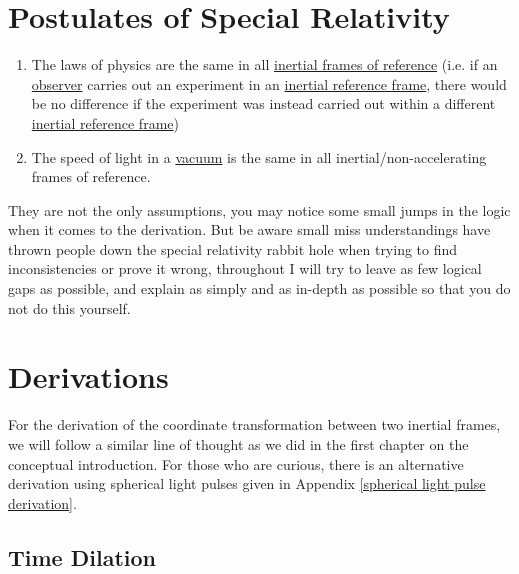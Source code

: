 \section{Postulates of Special Relativity}

\begin{tcolorbox}[breakable]
	\begin{enumerate}
		\item The laws of physics are the same in all \hyperlink{def-Inertial-reference-frame}{inertial frames of reference} (i.e. if an \hyperlink{def-observer}{observer} carries out an experiment in an \hyperlink{def-Inertial-reference-frame}{inertial reference frame}, there would be no difference if the experiment was instead carried out within a different \hyperlink{def-Inertial-reference-frame}{inertial reference frame})
		\item The speed of light in a \hyperlink{def-vacuum}{vacuum} is the same in all inertial/non-accelerating frames of reference.
	\end{enumerate}
\end{tcolorbox}

They are not the only assumptions, you may notice some small jumps in the logic when it comes to the derivation. But be aware small miss understandings have thrown people down the special relativity rabbit hole when trying to find inconsistencies or prove it wrong, throughout I will try to leave as few logical gaps as possible, and explain as simply and as in-depth as possible so that you do not do this yourself.

\section{Derivations}%
For the derivation of the coordinate transformation between two inertial frames, we will follow a similar line of thought as we did in the first chapter on the conceptual introduction. For those who are curious, there is an alternative derivation using spherical light pulses given in Appendix \ref{spherical light pulse derivation}.

\subsection{Time Dilation}

